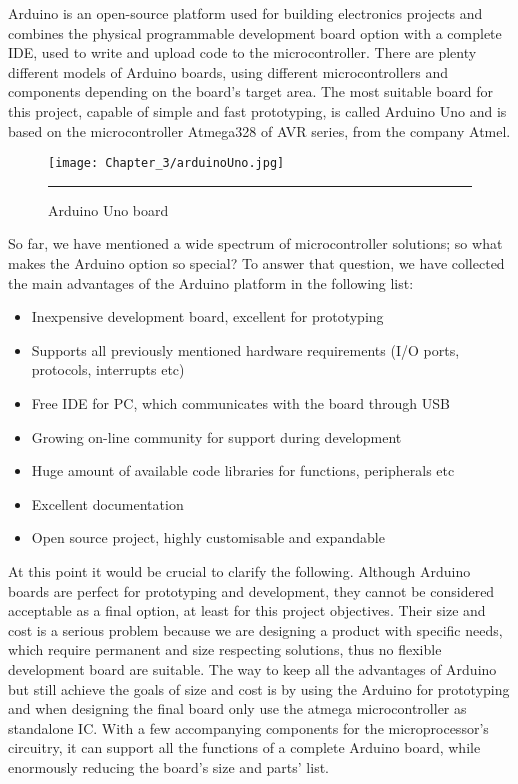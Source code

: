 Arduino is an open-source platform used for building electronics projects and combines the physical programmable development board option with a complete IDE, used to write and upload code to the microcontroller. There are plenty different models of Arduino boards, using different microcontrollers and components depending on the board's target area. The most suitable board for this project, capable of simple and fast prototyping, is called Arduino Uno and is based on the microcontroller Atmega328 of AVR series, from the company Atmel.\\

\begin{figure}[htbp]
	\centering
		\texttt{[image: Chapter\_3/arduinoUno.jpg]}
		\rule{35em}{0.5pt}
	\caption{Arduino Uno board}
	\label{fig:arduinoUno}
\end{figure}

So far, we have mentioned a wide spectrum of microcontroller solutions; so what makes the Arduino option so special? To answer that question, we have collected the main advantages of the Arduino platform in the following list:

\begin{itemize}
    \item Inexpensive development board, excellent for prototyping
    \item Supports all previously mentioned hardware requirements (I/O ports, protocols, interrupts etc)
    \item Free IDE for PC, which communicates with the board through USB
    \item Growing on-line community for support during development
    \item Huge amount of available code libraries for functions, peripherals etc
    \item Excellent documentation
    \item Open source project, highly customisable and expandable
\end{itemize}

At this point it would be crucial to clarify the following. Although Arduino boards are perfect for prototyping and development, they cannot be considered acceptable as a final option, at least for this project objectives. Their size and cost is a serious problem because we are designing a product with specific needs, which require permanent and size respecting solutions, thus no flexible development board are suitable. The way to keep all the advantages of Arduino but still achieve the goals of size and cost is by using the Arduino for prototyping and when designing the final board only use the atmega microcontroller as standalone IC. With a few accompanying components for the microprocessor's circuitry, it can support all the functions of a complete Arduino board, while enormously reducing the board's size and parts' list.\\

